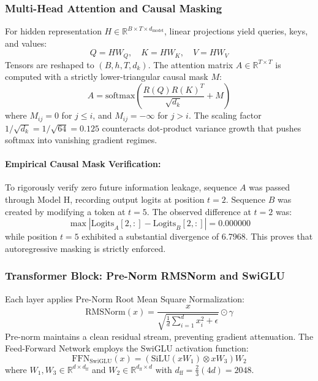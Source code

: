 \documentclass[10pt,a4paper]{article}
\begin{document}
\subsubsection{Multi-Head Attention and Causal Masking}
For hidden representation $H \in \mathbb{R}^{B \times T \times d_{\text{model}}}$, linear projections yield queries, keys, and values:
\begin{equation}
Q = HW_Q, \quad K = HW_K, \quad V = HW_V
\end{equation}
Tensors are reshaped to $(B, h, T, d_k)$. The attention matrix $A \in \mathbb{R}^{T \times T}$ is computed with a strictly lower-triangular causal mask $M$:
\begin{equation}
A = \text{softmax}\left( \frac{R(Q) R(K)^T}{\sqrt{d_k}} + M \right)
\end{equation}
where $M_{ij} = 0$ for $j \le i$, and $M_{ij} = -\infty$ for $j > i$.
The scaling factor $1/\sqrt{d_k} = 1/\sqrt{64} = 0.125$ counteracts dot-product variance growth that pushes softmax into vanishing gradient regimes.

\paragraph{Empirical Causal Mask Verification:}
To rigorously verify zero future information leakage, sequence $A$ was passed through Model H, recording output logits at position $t=2$. Sequence $B$ was created by modifying a token at $t=5$. The observed difference at $t=2$ was:
\begin{equation}
\max |\text{Logits}_A[2, :] - \text{Logits}_B[2, :] | = \mathbf{0.000000}
\end{equation}
while position $t=5$ exhibited a substantial divergence of 6.7968. This proves that autoregressive masking is strictly enforced.

\subsubsection{Transformer Block: Pre-Norm RMSNorm and SwiGLU}
Each layer applies Pre-Norm Root Mean Square Normalization:
\begin{equation}
\text{RMSNorm}(x) = \frac{x}{\sqrt{\frac{1}{d}\sum_{i=1}^d x_i^2 + \epsilon}} \odot \gamma
\end{equation}
Pre-norm maintains a clean residual stream, preventing gradient attenuation. The Feed-Forward Network employs the SwiGLU activation function:
\begin{equation}
\text{FFN}_{\text{SwiGLU}}(x) = \left( \text{SiLU}(xW_1) \otimes xW_3 \right) W_2
\end{equation}
where $W_1, W_3 \in \mathbb{R}^{d \times d_{\text{ff}}}$ and $W_2 \in \mathbb{R}^{d_{\text{ff}} \times d}$ with $d_{\text{ff}} = \frac{2}{3}(4d) = 2048$.
\end{document}
